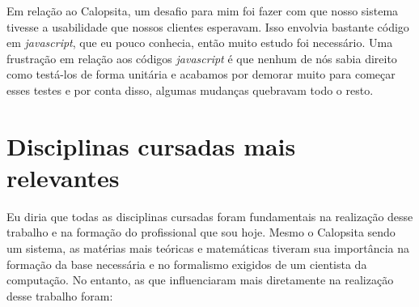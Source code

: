 \documentclass[titlepage,a4paper]{article}
\newcommand{\calopsita}{Calopsita}
\begin{document}
Em relação ao \calopsita{}, um desafio para mim foi fazer com que nosso sistema tivesse a usabilidade que nossos clientes esperavam. Isso envolvia bastante código em \textit{javascript}, que eu pouco conhecia, então muito estudo foi necessário. Uma frustração em relação aos códigos \textit{javascript} é que nenhum de nós sabia direito como testá-los de forma unitária e acabamos por demorar muito para começar esses testes e por conta disso, algumas mudanças quebravam todo o resto.

\section{Disciplinas cursadas mais relevantes}

Eu diria que todas as disciplinas cursadas foram fundamentais na realização desse trabalho e na formação do profissional que sou hoje. Mesmo o \calopsita{} sendo um sistema, as matérias mais teóricas e matemáticas tiveram sua importância na formação da base necessária e no formalismo exigidos de um cientista da computação. No entanto, as que influenciaram mais diretamente na realização desse trabalho foram:
\end{document}
